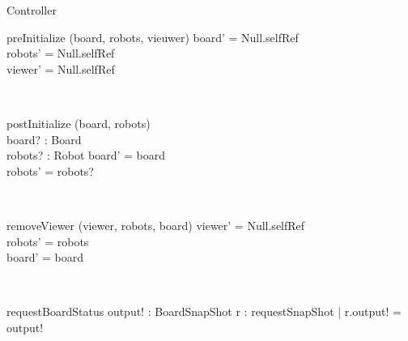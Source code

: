 \documentclass[12pt]{article}
\begin{document}
\begin{class}{Controller}
\znewpage
\begin{schema}{preInitialize}
\Delta (board, robots, vieuwer)
\where
board' = Null.selfRef \\
robots' = Null.selfRef \\
viewer' = Null.selfRef
\end{schema}\\
\begin{schema}{postInitialize}
\Delta (board, robots) \\
board? : Board \\
robots? : \power Robot
\where
board' = board \\
robots' = robots?
\end{schema}\\
\begin{schema}{removeViewer}
\Delta (viewer, robots, board)
\where
viewer' = Null.selfRef \\
robots' = robots \\
board' = board
\end{schema}\\
\begin{schema}{requestBoardStatus}
output! : BoardSnapShot
\where
\exists r : requestSnapShot | r.output! = output!
\end{schema}
\end{class}
\end{document}
